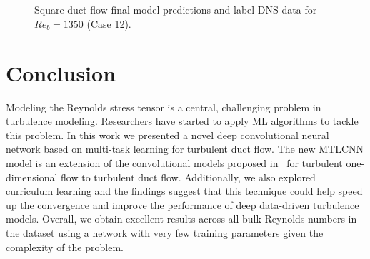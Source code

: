 \documentclass[11pt]{article}
\numberwithin{equation}{section}
\theoremstyle{plain}
\theoremstyle{definition}
\begin{document}
\begin{figure}[!ht]
\centering
{}
\\
\\
\\
\\

\caption{Square duct flow final model predictions and label DNS data for $Re_{b}=1350$ (Case 12).}
\label{fig:prediction1350uv}
\end{figure}














\clearpage
\section{Conclusion}
\label{sec:Conclusion}

Modeling the Reynolds stress tensor is a central, challenging problem in turbulence modeling. Researchers have started to apply ML algorithms to tackle this problem. In this work we presented a novel deep convolutional neural network based on multi-task learning for turbulent duct flow. The new MTLCNN model is an extension of the convolutional models proposed in~\cite{borde2021convolutional} for turbulent one-dimensional flow to turbulent duct flow. Additionally, we also explored curriculum learning and the findings suggest that this technique could help speed up the convergence and improve the performance of deep data-driven turbulence models. Overall, we obtain excellent results across all bulk Reynolds numbers in the dataset using a network with very few training parameters given the complexity of the problem.
\end{document}
